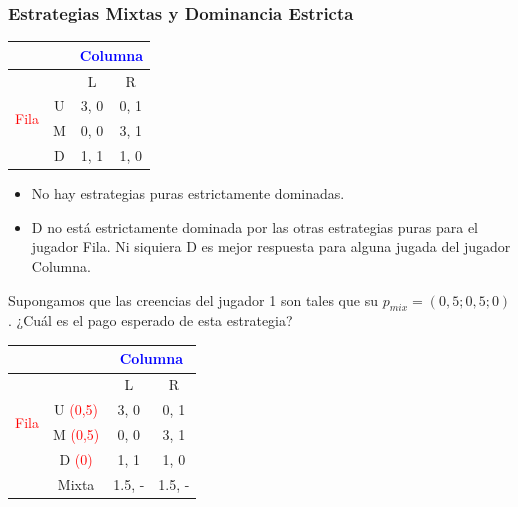 \documentclass{article}
\begin{document}
            \subsubsection*{Estrategias Mixtas y Dominancia Estricta}
                \begin{table}[H]
                    \centering
                        \begin{tabular}{|c|c|c|c|}
                        \hline
                        & & \multicolumn{2}{|c|}{\textcolor{Blue}{Columna}} \\ \hline
                                                & & L & R \\ \hline
                        \multirow{2}{*}{\textcolor{Red}{Fila}} 
                                                & U & 3, 0 & 0, 1 \\ \cline{2-4} 
                                                & M & 0, 0 & 3, 1 \\ \cline{2-4}
                                                & D & 1, 1 & 1, 0 \\ \hline
                        \end{tabular}
                \end{table}
                \begin{itemize}
                    \item No hay estrategias puras estrictamente dominadas.
                    \item D no está estrictamente dominada por las otras estrategias puras para el jugador Fila. Ni siquiera D es mejor respuesta para alguna jugada del jugador Columna.
                \end{itemize}
                Supongamos que las creencias del jugador 1 son tales que su \(p_{mix} = (0,5;0,5;0)\). ¿Cuál es el pago esperado de esta estrategia?
                \begin{table}[H]
                    \centering
                        \begin{tabular}{|c|c|c|c|}
                        \hline
                        & & \multicolumn{2}{|c|}{\textcolor{Blue}{Columna}} \\ \hline
                                                & & L & R \\ \hline
                        \multirow{2}{*}{\textcolor{Red}{Fila}} 
                                                & U \textcolor{red}{(0,5)}& 3, 0 & 0, 1 \\ \cline{2-4} 
                                                & M \textcolor{red}{(0,5)}& 0, 0 & 3, 1 \\ \cline{2-4}
                                                & D \textcolor{red}{(0)}& 1, 1 & 1, 0 \\ \cline{2-4}
                                                & Mixta & 1.5, - & 1.5, - \\ \hline
                        \end{tabular}
                \end{table}
\end{document}
